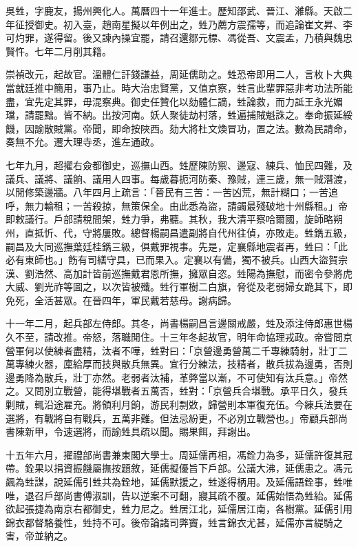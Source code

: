 \begin{pinyinscope}
吳甡，字鹿友，揚州興化人。萬曆四十一年進士。歷知邵武、晉江、濰縣。天啟二年征授御史。初入臺，趙南星擬以年例出之，甡乃薦方震孺等，而追論崔文昇、李可灼罪，遂得留。後又諫內操宜罷，請召還鄒元標、馮從吾、文震孟，乃積與魏忠賢忤。七年二月削其籍。

崇禎改元，起故官。溫體仁訐錢謙益，周延儒助之。甡恐帝即用二人，言枚卜大典當就廷推中簡用，事乃止。時大治忠賢黨，又值京察，甡言此輩罪惡非考功法所能盡，宜先定其罪，毋混察典。御史任贊化以劾體仁謫，甡論救，而力詆王永光媚璫，請罷黜。皆不納。出按河南。妖人聚徒劫村落，甡遍捕賊魁誅之。奉命振延綏饑，因諭散賊黨。帝聞，即命按陜西。劾大將杜文煥冒功，置之法。數為民請命，奏無不允。遷大理寺丞，進左通政。

七年九月，超擢右僉都御史，巡撫山西。甡歷陳防禦、邊寇、練兵、恤民四難，及議兵、議將、議餉、議用人四事。每歲暮扼河防秦、豫賊，連三歲，無一賊潛渡，以閒修築邊牆。八年四月上疏言：「晉民有三苦：一苦凶荒，無計糊口；一苦追呼，無力輸租；一苦殺掠，無策保全。由此悉為盜，請蠲最殘破地十州縣租。」帝即敕議行。戶部請稅間架，甡力爭，弗聽。其秋，我大清平察哈爾國，旋師略朔州，直抵忻、代，守將屢敗。總督楊嗣昌遣副將自代州往偵，亦敗走。甡鐫五級，嗣昌及大同巡撫葉廷桂鐫三級，俱戴罪視事。先是，定襄縣地震者再，甡曰：「此必有東師也。」飭有司繕守具，已而果入。定襄以有備，獨不被兵。山西大盜賀宗漢、劉浩然、高加計皆前巡撫戴君恩所撫，擁眾自恣。甡陽為撫慰，而密令參將虎大威、劉光祚等圖之，以次皆被殲。甡行軍樹二白旗，脅從及老弱婦女跪其下，即免死，全活甚眾。在晉四年，軍民戴若慈母。謝病歸。

十一年二月，起兵部左侍郎。其冬，尚書楊嗣昌言邊關戒嚴，甡及添注侍郎惠世楊久不至，請改推。帝怒，落職閒住。十三年冬起故官，明年命協理戎政。帝嘗問京營軍何以使練者盡精，汰者不嘩，甡對曰：「京營邊勇營萬二千專練騎射，壯丁二萬專練火器，廩給厚而技與散兵無異。宜行分練法，技精者，散兵拔為邊勇，否則邊勇降為散兵，壯丁亦然。老弱者汰補，革弊當以漸，不可使知有汰兵意。」帝然之。又問別立戰營，能得堪戰者五萬否，甡對：「京營兵合堪戰。承平日久，發兵剿賊，輒沿途雇充。將領利月餉，游民利剽敚，歸營則本軍復充伍。今練兵法要在選將，有戰將自有戰兵，五萬非難。但法忌紛更，不必別立戰營也。」帝顧兵部尚書陳新甲，令速選將，而諭甡具疏以聞。賜果餌，拜謝出。

十五年六月，擢禮部尚書兼東閣大學士。周延儒再相，馮銓力為多，延儒許復其冠帶。銓果以捐資振饑屬撫按題敘，延儒擬優旨下戶部。公議大沸，延儒患之。馮元飆為甡謀，說延儒引甡共為銓地，延儒默援之，甡遂得柄用。及延儒語銓事，甡唯唯，退召戶部尚書傅淑訓，告以逆案不可翻，寢其疏不覆。延儒始悟為甡紿。延儒欲起張捷為南京右都御史，甡力尼之。甡居江北，延儒居江南，各樹黨。延儒引用錦衣都督駱養性，甡持不可。後帝論諸司弊竇，甡言錦衣尤甚，延儒亦言緹騎之害，帝並納之。


\end{pinyinscope}
